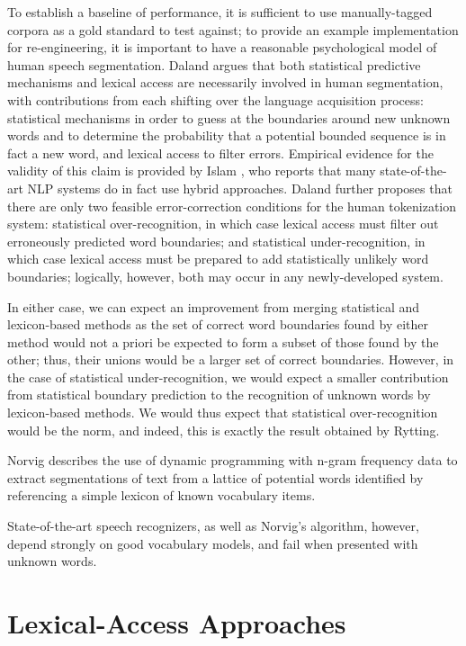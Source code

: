To establish a baseline of performance, it is sufficient to use manually-tagged corpora as a gold standard to test against; to provide an example implementation for re-engineering, it is important to have a reasonable psychological model of human speech segmentation. Daland\cite{daland09} argues that both statistical predictive mechanisms and lexical access are necessarily involved in human segmentation, with contributions from each shifting over the language acquisition process: statistical mechanisms in order to guess at the boundaries around new unknown words and to determine the probability that a potential bounded sequence is in fact a new word, and lexical access to filter errors. Empirical evidence for the validity of this claim is provided by Islam \cite{islam07}, who reports that many state-of-the-art NLP systems do in fact use hybrid approaches. Daland\cite{daland09} further proposes that there are only two feasible error-correction conditions for the human tokenization system: statistical over-recognition, in which case lexical access must filter out erroneously predicted word boundaries; and statistical under-recognition, in which case lexical access must be prepared to add statistically unlikely word boundaries; logically, however, both may occur in any newly-developed system.

In either case, we can expect an improvement from merging statistical and lexicon-based methods as the set of correct word boundaries found by either method would not a priori be expected to form a subset of those found by the other; thus, their unions would be a larger set of correct boundaries. However, in the case of statistical under-recognition, we would expect a smaller contribution from statistical boundary prediction to the recognition of unknown words by lexicon-based methods. We would thus expect that statistical over-recognition would be the norm, and indeed, this is exactly the result obtained by Rytting\cite{rytting04}.


Norvig\cite{norvig14} describes the use of dynamic programming with n-gram frequency data to extract segmentations of text from a lattice of potential words identified by referencing a simple lexicon of known vocabulary items.

State-of-the-art speech recognizers, as well as Norvig's algorithm, however, depend strongly on good vocabulary models, and fail when presented with unknown words.


\section{Lexical-Access Approaches}

